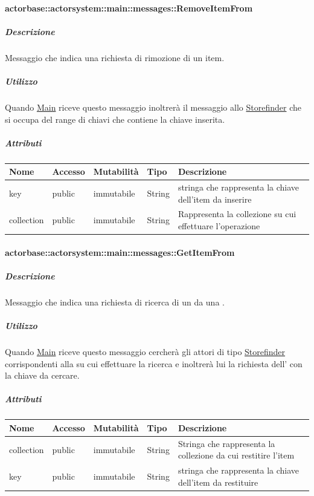 \documentclass{scalatekids-article}
\begin{document}
\paragraph{actorbase::actorsystem::main::messages::RemoveItemFrom}
\label{sec:actorbase::actorsystem::main::messages::RemoveItemFrom}

\subparagraph{Descrizione}
Messaggio che indica una richiesta di rimozione di un item.

\subparagraph{Utilizzo}
Quando \hyperref[sec:actorbase::actorsystem::main::Main]{Main}
riceve questo messaggio inoltrerà il messaggio allo \hyperref[sec:actorbase::actorsystem::storefinder::Storefinder]{Storefinder}
che si occupa del range di chiavi che contiene la chiave inserita.

\subparagraph{Attributi}
\begin{tabular}{| p{3cm} | p{1.5cm} | p{2cm} | p{2cm} | p{8.5cm} |}
  \hline
  Nome & Accesso & Mutabilità & Tipo & Descrizione\\
  \hline
  key & public & immutabile & String & stringa che rappresenta la chiave dell'item da inserire \\
  \hline
  collection & public & immutabile & String & Rappresenta la collezione su cui effettuare l'operazione \\
  \hline
\end{tabular}

\paragraph{actorbase::actorsystem::main::messages::GetItemFrom}
\label{sec:actorbase::actorsystem::main::messages::GetItemFrom}

\subparagraph{Descrizione}

Messaggio che indica una richiesta di ricerca di un  da una .

\subparagraph{Utilizzo}

Quando \hyperref[sec:actorbase::actorsystem::main::Main]{Main}
riceve questo messaggio cercherà gli attori di tipo
\hyperref[sec:actorbase::actorsystem::storefinder::Storefinder]{Storefinder}
corrispondenti alla  su cui effettuare la ricerca
e inoltrerà lui la richiesta dell' con la chiave da cercare.

\subparagraph{Attributi}
\begin{tabular}{| p{3cm} | p{1.5cm} | p{2cm} | p{2cm} | p{8.5cm} |}
  \hline
  Nome & Accesso & Mutabilità & Tipo & Descrizione\\
  \hline
  collection & public & immutabile & String & Stringa che rappresenta la collezione da cui restitire l'item\\
  \hline
  key & public & immutabile & String & stringa che rappresenta la chiave dell'item da restituire \\
  \hline
\end{tabular}
\end{document}
